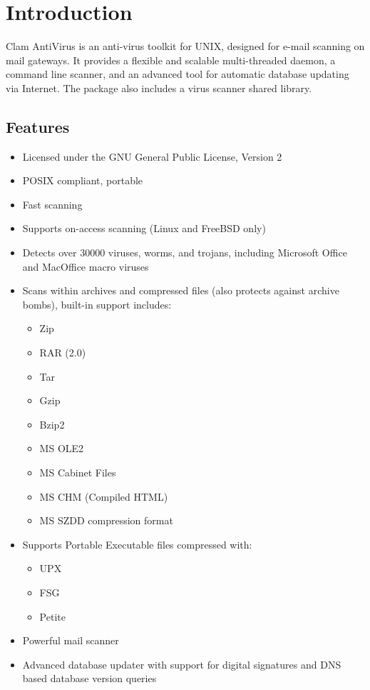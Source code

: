 \documentclass[a4paper,titlepage,12pt]{article}
\begin{document}
    \newpage

    \section{Introduction}

    Clam AntiVirus is an anti-virus toolkit for UNIX, designed for e-mail
    scanning on mail gateways. It provides a flexible and scalable
    multi-threaded daemon, a command line scanner, and an advanced tool for
    automatic database updating via Internet. The package also includes
    a virus scanner shared library.

    \subsection{Features}

    \begin{itemize}
	\item{Licensed under the GNU General Public License, Version 2}
	\item{POSIX compliant, portable}
	\item{Fast scanning}
	\item{Supports on-access scanning (Linux and FreeBSD only)}
	\item{Detects over 30000 viruses, worms, and trojans, including
	      Microsoft Office and MacOffice macro viruses}
	\item{Scans within archives and compressed files (also protects
	      against archive bombs), built-in support includes:
	      \begin{itemize}
		\item Zip
		\item RAR (2.0)
		\item Tar
		\item Gzip
		\item Bzip2
		\item MS OLE2
		\item MS Cabinet Files
		\item MS CHM (Compiled HTML)
		\item MS SZDD compression format
	      \end{itemize}}
	\item{Supports Portable Executable files compressed with:}
	      \begin{itemize}
		\item UPX
		\item FSG
		\item Petite
	      \end{itemize}
	\item{Powerful mail scanner}
	\item{Advanced database updater with support for digital signatures
	      and DNS based database version queries}
    \end{itemize}
\end{document}
